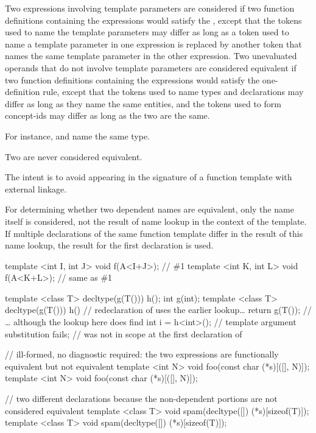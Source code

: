 \pnum
{}%
Two expressions involving template parameters are considered
if two function definitions containing the expressions would satisfy
the , except that the tokens used
to name the template parameters may differ as long as a token used to
name a template parameter in one expression is replaced by another token
that names the same template parameter in the other expression.
Two unevaluated operands that do not involve template parameters
are considered equivalent
if two function definitions containing the expressions
would satisfy the one-definition rule,
except that the tokens used to name types and declarations may differ
as long as they name the same entities, and
the tokens used to form concept-ids may differ
as long as the two  are the same.
\begin{note}
For instance,  and  name the same type.
\end{note}
Two  are never considered equivalent.
\begin{note}
The intent is to avoid  appearing in the
signature of a function template with external linkage.
\end{note}
For determining whether two dependent names are
equivalent, only the name itself is considered, not the result of name
lookup in the context of the template. If multiple declarations of the
same function template differ in the result of this name lookup, the
result for the first declaration is used.
\begin{example}
\begin{codeblock}
template <int I, int J> void f(A<I+J>);         // \#1
template <int K, int L> void f(A<K+L>);         // same as \#1

template <class T> decltype(g(T())) h();
int g(int);
template <class T> decltype(g(T())) h()         // redeclaration of  uses the earlier lookup\ldots
  { return g(T()); }                            // \ldots{} although the lookup here does find 
int i = h<int>();                               // template argument substitution fails; 
                                                // was not in scope at the first declaration of 

// ill-formed, no diagnostic required: the two expressions are functionally equivalent but not equivalent
template <int N> void foo(const char (*s)[([]{}, N)]);
template <int N> void foo(const char (*s)[([]{}, N)]);

// two different declarations because the non-dependent portions are not considered equivalent
template <class T> void spam(decltype([]{}) (*s)[sizeof(T)]);
template <class T> void spam(decltype([]{}) (*s)[sizeof(T)]);
\end{codeblock}
\end{example}
